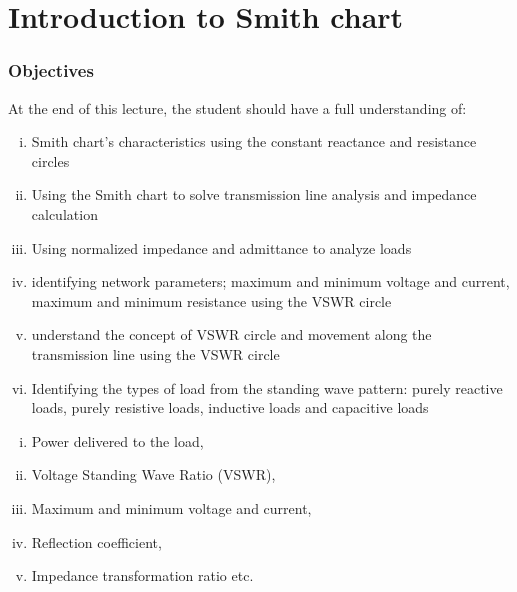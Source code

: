 \chapter{Introduction to Smith chart}\label{lec:lec7}
\begin{mdframed}[ backgroundcolor=lightblue, linewidth=1pt, hidealllines=true]
\subsection{Objectives}
At the end of this lecture, the student should have a full understanding of:
\begin{enumerate}[(i)]
\item Smith chart's characteristics using the constant reactance and resistance circles
\item Using the Smith chart to solve transmission line analysis and impedance calculation
\item Using normalized impedance and admittance to analyze loads
\item identifying network parameters; maximum and minimum voltage and current, maximum  and minimum resistance using the VSWR circle
\item understand the concept of VSWR circle and movement along the transmission line  using the VSWR circle
\item Identifying the types of load from the standing wave pattern: purely reactive loads, purely resistive loads, inductive loads and capacitive loads
\end{enumerate}
\end{mdframed}

\vspace{0.7cm}{Previously, we were able to derive equations for different parameters for a transmission line such as;}
\begin{enumerate}[(i)]
\item Power delivered to the load,
\item Voltage Standing Wave Ratio (VSWR),
\item Maximum and minimum voltage and current,
\item Reflection coefficient,
\item Impedance transformation ratio etc.
\end{enumerate}


